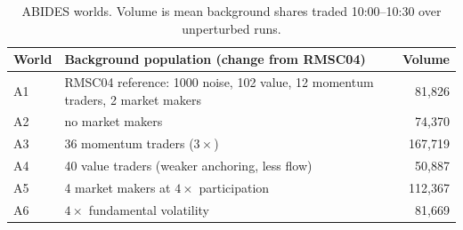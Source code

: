 \begin{table}[!htbp]
\centering\small
\caption{ABIDES worlds. Volume is mean background shares traded 10:00--10:30 over unperturbed runs.}\label{tab:worlds}
\begin{tabular}{llr}
\toprule
World & Background population (change from RMSC04) & Volume \\
\midrule
A1 & RMSC04 reference: 1000 noise, 102 value, 12 momentum traders, 2 market makers & 81,826 \\
A2 & no market makers & 74,370 \\
A3 & 36 momentum traders ($3\times$) & 167,719 \\
A4 & 40 value traders (weaker anchoring, less flow) & 50,887 \\
A5 & 4 market makers at $4\times$ participation & 112,367 \\
A6 & $4\times$ fundamental volatility & 81,669 \\
\bottomrule
\end{tabular}
\end{table}
